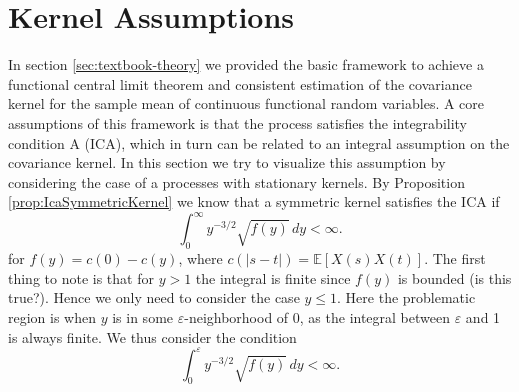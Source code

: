 \section{Kernel Assumptions}

In section \ref{sec:textbook-theory} we provided the basic framework to achieve a
functional central limit theorem and consistent estimation of the covariance kernel for
the sample mean of continuous functional random variables. A core assumptions of this
framework is that the process satisfies the integrability condition A (ICA), which in
turn can be related to an integral assumption on the covariance kernel. In this section
we try to visualize this assumption by considering the case of a processes with
stationary kernels. By Proposition \ref{prop:IcaSymmetricKernel}
we know that a symmetric kernel satisfies the ICA if
\[
    \int_0^\infty y^{-3/2} \sqrt{f(y)} \, dy < \infty.
\]
for $f(y) = c(0) - c(y)$, where $c(|s-t|) = \mathbb{E}[X(s)X(t)]$. The first thing to
note is that for $y > 1$ the integral is finite since $f(y)$ is bounded (is this true?).
Hence we only need to consider the case $y \leq 1$. Here the problematic region is
when $y$ is in some $\varepsilon$-neighborhood of $0$, as the integral between $\varepsilon$ and 1 is
always finite. We thus consider the condition
\[
    \int_0^\varepsilon y^{-3/2} \sqrt{f(y)} \, dy < \infty.
\]

